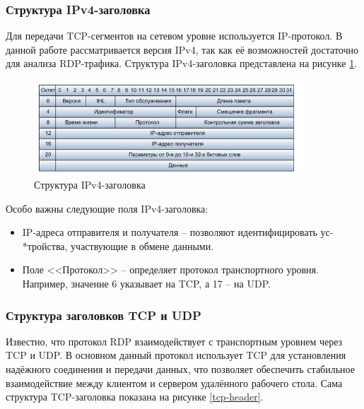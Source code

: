\documentclass[spec, och, diploma]{SCWorks}
\begin{document}
\subsubsection{Структура IPv4-заголовка}

Для передачи TCP-сегментов на сетевом уровне используется IP-протокол. В данной работе рассматривается версия IPv4, 
так как её возможностей достаточно для анализа RDP-трафика. Структура IPv4-заголовка представлена на рисунке \ref{ipv4-header}.

\begin{figure}[H]
  \centering
  \includegraphics[width=0.9\textwidth]{pics/ipv4-header.png}
  \caption{Структура IPv4-заголовка}
  \label{ipv4-header}
\end{figure}

Особо важны следующие поля IPv4-заголовка:

\begin{itemize}
  \item IP-адреса отправителя и получателя -- позволяют идентифицировать ус-\\*тройства, участвующие в обмене данными.
  \item Поле <<Протокол>> -- определяет протокол транспортного уровня. Например, значение 6 указывает на TCP, а 17 -- на UDP.
\end{itemize}

\subsubsection{Структура заголовков TCP и UDP}

Известно, что протокол RDP взаимодействует с транспортным уровнем через TCP и UDP.
В основном данный протокол использует TCP для установления надёжного соединения и передачи данных, что позволяет обеспечить стабильное взаимодействие 
между клиентом и сервером удалённого рабочего стола. Сама структура TCP-заголовка показана на рисунке \ref{tcp-header}.
\end{document}
